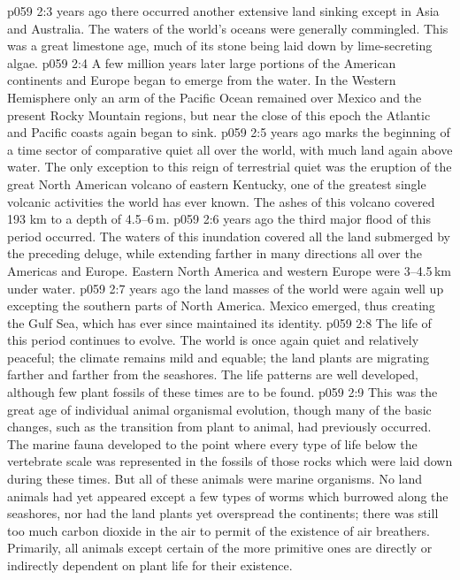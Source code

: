 \vs p059 2:3 \pc {} years ago there occurred another extensive land sinking except in Asia and Australia. The waters of the world’s oceans were generally commingled. This was a great limestone age, much of its stone being laid down by lime\hyp{}secreting algae.
\vs p059 2:4 A few million years later large portions of the American continents and Europe began to emerge from the water. In the Western Hemisphere only an arm of the Pacific Ocean remained over Mexico and the present Rocky Mountain regions, but near the close of this epoch the Atlantic and Pacific coasts again began to sink.
\vs p059 2:5 \pc {} years ago marks the beginning of a time sector of comparative quiet all over the world, with much land again above water. The only exception to this reign of terrestrial quiet was the eruption of the great North American volcano of eastern Kentucky, one of the greatest single volcanic activities the world has ever known. The ashes of this volcano covered 193 km to a depth of 4.5--6\,m.
\vs p059 2:6 \pc {} years ago the third major flood of this period occurred. The waters of this inundation covered all the land submerged by the preceding deluge, while extending farther in many directions all over the Americas and Europe. Eastern North America and western Europe were 3--4.5\,km under water.
\vs p059 2:7 \pc {} years ago the land masses of the world were again well up excepting the southern parts of North America. Mexico emerged, thus creating the Gulf Sea, which has ever since maintained its identity.
\vs p059 2:8 The life of this period continues to evolve. The world is once again quiet and relatively peaceful; the climate remains mild and equable; the land plants are migrating farther and farther from the seashores. The life patterns are well developed, although few plant fossils of these times are to be found.
\vs p059 2:9 \pc This was the great age of individual animal organismal evolution, though many of the basic changes, such as the transition from plant to animal, had previously occurred. The marine fauna developed to the point where every type of life below the vertebrate scale was represented in the fossils of those rocks which were laid down during these times. But all of these animals were marine organisms. No land animals had yet appeared except a few types of worms which burrowed along the seashores, nor had the land plants yet overspread the continents; there was still too much carbon dioxide in the air to permit of the existence of air breathers. Primarily, all animals except certain of the more primitive ones are directly or indirectly dependent on plant life for their existence.
